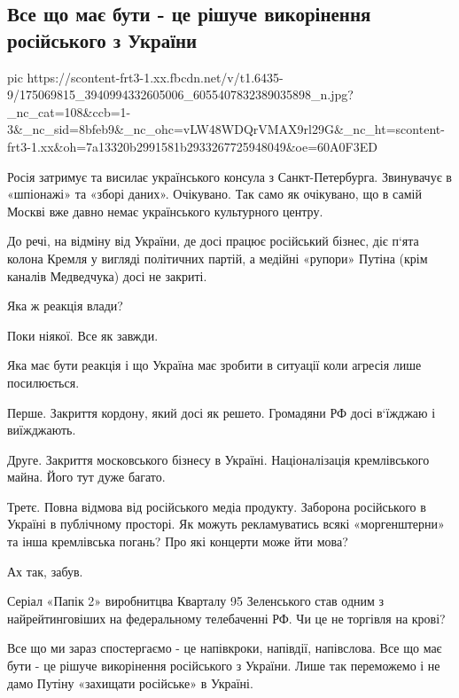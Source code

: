  
 
 
 
 
\subsection{Все що має бути - це рішуче викорінення російського з України}
\label{sec:17_04_2021.fb.smolij_andrij.1.konsul_ukraina_rossia_ukrcentr}

\ifcmt
  pic https://scontent-frt3-1.xx.fbcdn.net/v/t1.6435-9/175069815_3940994332605006_6055407832389035898_n.jpg?_nc_cat=108&ccb=1-3&_nc_sid=8bfeb9&_nc_ohc=vLW48WDQrVMAX9rl29G&_nc_ht=scontent-frt3-1.xx&oh=7a13320b2991581b2933267725948049&oe=60A0F3ED
\fi

Росія затримує та висилає українського консула з Санкт-Петербурга. Звинувачує в
«шпіонажі» та «зборі даних». Очікувано. Так само як очікувано, що в самій
Москві вже давно немає українського культурного центру. 

До речі, на відміну від України, де досі працює російський бізнес, діє п‘ята
колона Кремля у вигляді політичних партій, а медійні «рупори» Путіна (крім
каналів Медведчука) досі не закриті.

Яка ж реакція влади? 

Поки ніякої. Все як завжди.

Яка має бути реакція і що Україна має зробити в ситуації коли агресія лише посилюється.

Перше. Закриття кордону, який досі як решето. Громадяни РФ досі в‘їжджаю і виїжджають. 

Друге. Закриття московського бізнесу в Україні. Націоналізація кремлівського майна. Його тут дуже багато.

Третє. Повна відмова від російського медіа продукту. Заборона російського в
Україні в публічному просторі. Як можуть рекламуватись всякі «моргенштерни» та
інша кремлівська погань? Про які концерти може йти мова? 

Ах так, забув. 

Серіал «Папік 2» виробнитцва Кварталу 95 Зеленського став одним з
найрейтинговіших на федеральному телебаченні РФ. Чи це не торгівля на крові? 

Все що ми зараз спостергаємо - це напівкроки, напівдії, напівслова. Все що має
бути - це рішуче викорінення російського з України. Лише так переможемо і не
дамо Путіну «захищати російське» в Україні.
